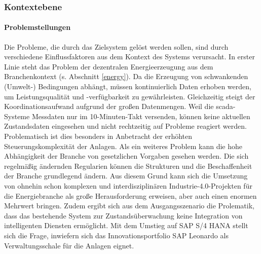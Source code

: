 \subsubsection {Kontextebene}

\paragraph{Problemstellungen}
Die Probleme, die durch das Zielsystem gelöst werden sollen, sind durch verschiedene Einflussfaktoren aus dem Kontext des Systems verursacht. In erster Linie steht das Problem der dezentralen Energieerzeugung aus dem Branchenkontext (s. Abschnitt \ref{energy}). Da die Erzeugung von schwankenden (Umwelt-) Bedingungen abhängt, müssen kontinuierlich Daten erhoben werden, um Leistungsqualität und -verfügbarkeit zu gewährleisten. Gleichzeitig steigt der Koordinationsaufwand aufgrund der großen Datenmengen. Weil die \ac{scada}-Systeme Messdaten nur im 10-Minuten-Takt versenden, können keine aktuellen Zustandsdaten eingesehen und nicht rechtzeitig auf Probleme reagiert werden. Problematisch ist dies besonders in Anbetracht der erhöhten Steuerungskomplexität der Anlagen. Als ein weiteres Problem kann die hohe Abhängigkeit der Branche von gesetzlichen Vorgaben gesehen werden. Die sich regelmäßig ändernden Regularien können die Strukturen und die Beschaffenheit der Branche grundlegend ändern. Aus diesem Grund kann sich die Umsetzung von ohnehin schon komplexen und interdisziplinären Industrie-4.0-Projekten für die Energiebranche als große Herausforderung erweisen, aber auch einen enormen Mehrwert bringen. Zudem ergibt sich aus dem Ausgangsszenario die Prolematik, dass das bestehende System zur Zustandsüberwachung keine Integration von intelligenten Diensten ermöglicht. Mit dem Umstieg auf SAP S/4 HANA stellt sich die Frage, inwiefern sich das  Innovationsportfolio SAP Leonardo als Verwaltungsschale für die Anlagen eignet.

